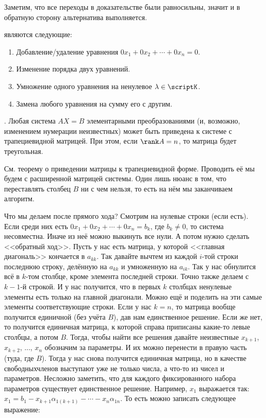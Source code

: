 \documentclass{article}
\begin{document}
\begin{itemize}
\begin{Proof}
            Заметим, что все переходы в доказательстве были равносильны, значит и в обратную сторону альтернатива выполняется.
        \end{Proof}
        \dfn {} являются следующие:
        \begin{enumerate}[1)]
            \item Добавление/удаление уравнения $0x_1+0x_2+\cdots+0x_n=0$.
            \item Изменение порядка двух уравнений.
            \item Умножение одного уравнения на ненулевое $\lambda\in\scriptK$.
            \item Замена любого уравнения на сумму его с другим.
        \end{enumerate}
        \thm {}. Любая система $AX=B$ элементарными преобразованиями (и, возможно, изменением нумерации неизвестных) может быть приведена к системе с трапециевидной матрицей. При этом, если $\rank A=n$, то матрица будет треугольная.
        \begin{Proof}
            См. теорему о приведении матрицы к трапециевидной форме. Проводить её мы будем с расширенной матрицей системы. Один лишь нюанс в том, что переставлять столбец $B$ ни с чем нельзя, то есть на нём мы заканчиваем алгоритм.
        \end{Proof}
        \begin{Comment}
            Что мы делаем после прямого хода? Смотрим на нулевые строки (если есть). Если среди них есть $0x_1+0x_2+\cdots+0x_n=b_k$, где $b_k\neq0$, то система несовместна. Иначе из неё можно выкинуть все нули. А потом нужно сделать <<обратный ход>>. Пусть у нас есть матрица, у которой <<главная диагональ>> кончается в $a_{kk}$. Так давайте вычтем из каждой $i$-той строки последнюю строку, делённую на $a_{kk}$ и умноженную на $a_{ik}$. Так у нас обнулится всё в $k$-том столбце, кроме элемента последней строки. Точно также делаем с $k-1$-й строкой. И у нас получится, что в первых $k$ столбцах ненулевые элементы есть только на главной диагонали. Можно ещё и поделить на эти самые элементы соответствующие строки. Если у нас $k=n$, то матрица вообще получится единичной (без учёта $B$), дав нам единственное решение. Если же нет, то получится единичная матрица, к которой справа приписаны какие-то левые столбцы, а потом $B$. Тогда, чтобы найти все решения давайте неизвестные $x_{k+1}$, $x_{k+2}$, ..., $x_n$ обозначим за параметры. И их можно перенести в правую часть (туда, где $B$). Тогда у нас снова получится единичная матрица, но в качестве свободныхчленов выступают уже не только числа, а что-то из чисел и параметров. Несложно заметить, что для каждого фиксированного набора параметров существует единственное решение. Например, $x_1$ выражается так: $x_1=b_1-x_{k+1}\alpha_{1(k+1)}-\cdots-x_n\alpha_{1n}$. То есть можно записать следующее выражение:

\end{Comment}
\end{itemize}
\end{document}
